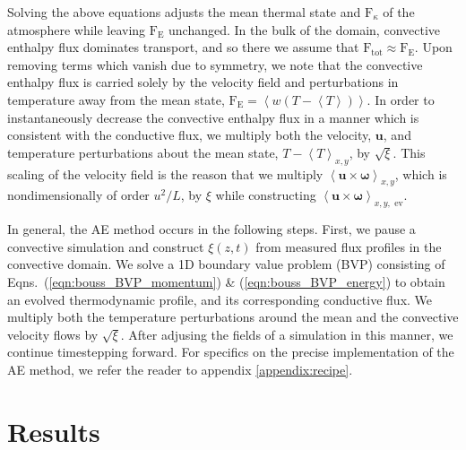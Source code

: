 \documentclass[aps, pre, onecolumn, nofootinbib, notitlepage, groupedaddress, amsfonts, amssymb, amsmath, longbibliography]{revtex4-1}
\newcommand{\angles}[1]{\ensuremath{\left\langle #1 \right\rangle}}
\begin{document}
Solving the above equations adjusts the mean thermal state and 
$\text{F}_{\kappa}$ of the atmosphere while leaving $\text{F}_{\text{E}}$
unchanged. In the  
bulk of the domain, convective enthalpy flux dominates transport, and so there we
assume that $\text{F}_{\text{tot}} \approx \text{F}_{\text{E}}$. Upon 
removing terms which vanish due to symmetry, we note that the convective
enthalpy flux is carried solely by the velocity field and perturbations in
temperature away from the mean state, $\text{F}_{\text{E}} = 
\angles{w(T - \angles{T})}$.
In order to instantaneously decrease the convective enthalpy flux in a manner
which is consistent with the conductive flux, 
we multiply both the velocity, $\bm{u}$,
and temperature perturbations about the mean state, $T-\angles{T}_{x,y}$,
 by $\sqrt{\xi}$. This scaling of the velocity field is the reason that we
multiply $\angles{\bm{u}\times\bm{\omega}}_{x, y}$, which is nondimensionally
of order $u^2/L$, by $\xi$ while constructing
$\angles{\bm{u}\times\bm{\omega}}_{x, y,\text{ ev}}$.

In general, the AE method occurs in the following steps. First, we pause a convective simulation and
construct $\xi(z,t)$ from measured flux profiles in the convective domain.
We solve a 1D boundary value problem (BVP) consisting of
Eqns.~(\ref{eqn:bouss_BVP_momentum}) \& (\ref{eqn:bouss_BVP_energy})
to obtain an evolved thermodynamic profile, and its corresponding conductive flux.
We multiply both the temperature perturbations around the mean and the
convective velocity flows by $\sqrt{\xi}$.
After adjusing the fields of a simulation in this manner, we continue timestepping forward.
For specifics on the precise implementation of the AE method, we refer
the reader to appendix \ref{appendix:recipe}.


\section{Results}
\label{sec:results}
\end{document}
